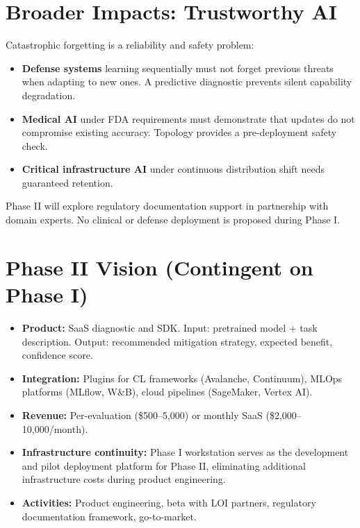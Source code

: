 \documentclass[11pt,letterpaper]{article}
\begin{document}
\section{Broader Impacts: Trustworthy AI}

Catastrophic forgetting is a reliability and safety problem:

\begin{itemize}[nosep]
  \item \textbf{Defense systems} learning sequentially must not forget previous threats when adapting to new ones. A predictive diagnostic prevents silent capability degradation.
  \item \textbf{Medical AI} under FDA requirements must demonstrate that updates do not compromise existing accuracy. Topology provides a pre-deployment safety check.
  \item \textbf{Critical infrastructure AI} under continuous distribution shift needs guaranteed retention.
\end{itemize}

Phase II will explore regulatory documentation support in partnership with domain experts. No clinical or defense deployment is proposed during Phase I.

\section{Phase II Vision (Contingent on Phase I)}

\begin{itemize}[nosep]
  \item \textbf{Product:} SaaS diagnostic and SDK. Input: pretrained model + task description. Output: recommended mitigation strategy, expected benefit, confidence score.
  \item \textbf{Integration:} Plugins for CL frameworks (Avalanche, Continuum), MLOps platforms (MLflow, W\&B), cloud pipelines (SageMaker, Vertex AI).
  \item \textbf{Revenue:} Per-evaluation (\$500--5,000) or monthly SaaS (\$2,000--10,000/month).
  \item \textbf{Infrastructure continuity:} Phase I workstation serves as the development and pilot deployment platform for Phase II, eliminating additional infrastructure costs during product engineering.
  \item \textbf{Activities:} Product engineering, beta with LOI partners, regulatory documentation framework, go-to-market.
\end{itemize}
\end{document}
